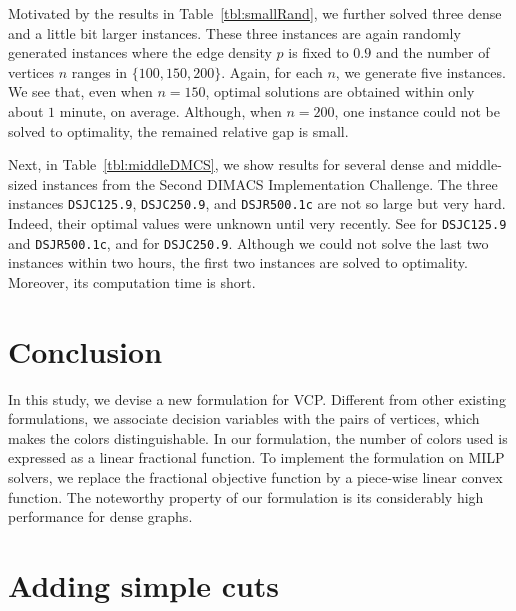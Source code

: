 \documentclass[11pt,a4paper]{article}
\begin{document}
\par

Motivated by the results in Table~\ref{tbl:smallRand}, 
we further solved three dense and a little bit larger instances. 
These three instances are again randomly generated instances 
where the edge density $p$ is fixed to $0.9$ and the number of vertices $n$ ranges in $\{100, 150, 200\}$. 
Again, for each $n$, we generate five instances. 
We see that, even when $n=150$, optimal solutions are obtained within only about $1$ minute, on average. 
Although, when $n=200$, one instance could not be solved to optimality, the remained relative gap is small. 

\par 

Next, in Table~\ref{tbl:middleDMCS}, 
we show results for several dense and middle-sized instances from the Second DIMACS Implementation Challenge. 
The three instances \texttt{DSJC125.9}, \texttt{DSJC250.9},	and \texttt{DSJR500.1c} are not so large but very hard. 
Indeed, their optimal values were unknown until very recently. See \cite{GuMa} for \texttt{DSJC125.9} and \texttt{DSJR500.1c}, 
and \cite{HeCoSe} for \texttt{DSJC250.9}. 
Although we could not solve the last two instances within two hours, 
the first two instances are solved to optimality. 
Moreover, its computation time is short. 


\section{Conclusion}

In this study, we devise a new formulation for VCP. 
Different from other existing formulations, 
we associate decision variables with the pairs of vertices, 
which makes the colors distinguishable. 
In our formulation, 
the number of colors used is expressed as a linear fractional function. 
To implement the formulation on MILP solvers, 
we replace the fractional objective function by a piece-wise linear convex function. 
The noteworthy property of our formulation is 
its considerably high performance for dense graphs. 





\section*{Adding simple cuts}
\end{document}
